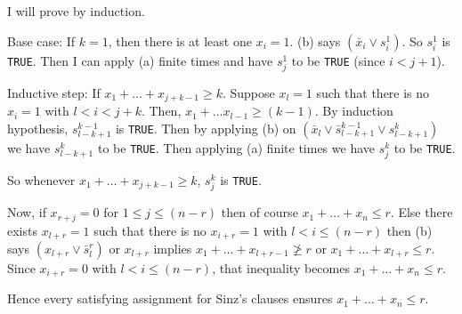 \documentclass[twoside]{article}
\begin{document}
\begin{enumerate}
          I will prove by induction.

          Base case: If $k = 1$, then there is at least one $x_i = 1$. (b) says $(\bar x_{i} \vee s^1_i)$. So $s^1_i$ is \texttt{TRUE}. Then I can apply (a) finite times and have $s^1_j$ to be \texttt{TRUE} (since $i < j+1$).

          Inductive step: If $x_1 + \ldots + x_{j+k-1} \geq k$. Suppose $x_l = 1$ such that there is no $x_i = 1$ with $l < i < j+k$. Then, $x_1 + \ldots x_{l-1} \geq (k-1)$. By induction hypothesis, $s^{k-1}_{l-k+1}$ is \texttt{TRUE}. Then by applying (b) on $(\bar x_l \vee \bar s^{k-1}_{l-k+1} \vee s^{k}_{l-k+1})$ we have $s^{k}_{l-k+1}$ to be \texttt{TRUE}. Then applying (a) finite times we have $s^k_j$ to be \texttt{TRUE}.

          So whenever $x_1 + \ldots + x_{j+k-1} \geq k$, $s^k_j$ is \texttt{TRUE}.

          Now, if $x_{r+j} = 0$ for $1 \leq j \leq (n-r)$ then of course $x_1 + \ldots + x_n \leq r$. Else there exists $x_{l+r} = 1$ such that there is no $x_{i+r} = 1$ with $l < i \leq (n-r)$ then (b) says $(x_{l+r} \vee \bar s^r_{l})$ or $x_{l+r}$ implies $x_1 + \ldots + x_{l+r-1} \not\geq r$ or $x_1 + \ldots + x_{l+r} \leq r$. Since $x_{i+r} = 0$ with $l < i \leq (n-r)$, that inequality becomes $x_1 + \ldots + x_n \leq r$.

          Hence every satisfying assignment for Sinz's clauses ensures $x_1 + \ldots + x_n \leq r$.
\end{enumerate}
\end{document}
